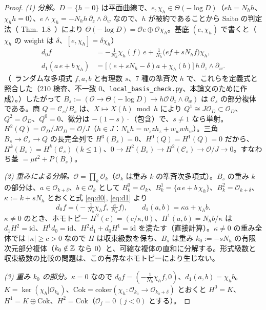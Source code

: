 \begin{proof}
\emph{(1) 分解。}$D=\{h=0\}$ は平面曲線で、$e,\chi_h\in\Theta(-\log D)$（$eh=N_hh$、$\chi_hh=0$）、$e\wedge\chi_h=-N_hh\,\partial_z\wedge\partial_w$ なので、$h$ が被約であることから Saito の判定法（\cite{Saito} Thm.~1.8\tC\ \tQ）により $\Theta(-\log D)=\mathcal Oe\oplus\mathcal O\chi_h$。基底 $(e,\chi_h)$ で書くと（$\chi_h$ の weight は $\delta$、$[e,\chi_h]=\delta\chi_h$）
\begin{align}
d_0f&=-\tfrac1{N_h}\chi_h(f)\,e+\tfrac1{N_h}\bigl(ef+sN_hf\bigr)\chi_h,\label{eq:d0}\\
d_1(a\,e+b\,\chi_h)&=\bigl[(e+sN_h-\delta)a+\chi_h(b)\bigr]\,h\,\partial_z\wedge\partial_w.\label{eq:d1}
\end{align}
（\tV\ ランダムな多項式 $f,a,b$ と有理数 $s$、7 種の準斉次 $h$ で、これらを定義式と照合した（210 検査、不一致 0、\texttt{local\_basis\_check.py}、本論文のために作成）。）したがって $B_s:=(\mathcal O\to\Theta(-\log D)\to h\mathcal O\,\partial_z\wedge\partial_w)$ は $\mathcal C_s$ の部分複体である。商 $Q=\mathcal C_s/B_s$ は、$X\mapsto X(h)\bmod h$ により $Q^1\cong J\mathcal O_D\subset\mathcal O_D$、$Q^2=\mathcal O_D$、$Q^0=0$、微分は $-(1-s)\cdot$（包含）で、$s\ne1$ なら単射。$H^2(Q)=\mathcal O_D/J\mathcal O_D=\mathcal O/J$（$h\in J$：$N_hh=w_zzh_z+w_wwh_w$）。三角 $B_s\to\mathcal C_s\to Q$ の長完全列で $H^3(B_s)=0$、$H^0(Q)=H^1(Q)=0$ だから、$H^k(B_s)=H^k(\mathcal C_s)\ (k\le1)$、$0\to H^2(B_s)\to H^2(\mathcal C_s)\to\mathcal O/J\to0$。すなわち茎 $=\mu t^2+P(B_s)$。

\emph{(2) 重みによる分解。}$\mathcal O=\prod_k\mathcal O_k$（$\mathcal O_k$ は重み $k$ の準斉次多項式）。$B_s$ の重み $k$ の部分は、$a\in\mathcal O_{k+\delta}$、$b\in\mathcal O_k$ として $B^0_k=\mathcal O_k$、$B^1_k=\{a\,e+b\,\chi_h\}$、$B^2_k=\mathcal O_{k+\delta}$、$\kappa:=k+sN_h$ とおくと式 \eqref{eq:d0}, \eqref{eq:d1} より
\[d_0f=\bigl(-\tfrac1{N_h}\chi_hf,\ \tfrac\kappa{N_h}f\bigr),\qquad d_1(a,b)=\kappa a+\chi_hb.\]
$\kappa\ne0$ のとき、ホモトピー $H^2(c)=(c/\kappa,0)$、$H^1(a,b)=N_hb/\kappa$ は $d_1H^2=\mathrm{id}$、$H^1d_0=\mathrm{id}$、$H^2d_1+d_0H^1=\mathrm{id}$ を満たす（直接計算）。$\kappa\ne0$ の重み全体では $|\kappa|\ge c>0$ なので $H$ は収束級数を保ち、$B_s$ は重み $k_0:=-sN_h$ の有限次元部分複体（$k_0\notin\mathbb Z$ なら 0）と、可縮な複体の直和に分解する。形式級数と収束級数の比較の問題は、この有界なホモトピーにより生じない。

\emph{(3) 重み $k_0$ の部分。}$\kappa=0$ なので $d_0f=(-\tfrac1{N_h}\chi_hf,0)$、$d_1(a,b)=\chi_hb$。$K=\ker(\chi_h|\mathcal O_{k_0})$、$\mathrm{Cok}=\mathrm{coker}(\chi_h:\mathcal O_{k_0}\to\mathcal O_{k_0+\delta})$ とおくと $H^0=K$、$H^1=K\oplus\mathrm{Cok}$、$H^2=\mathrm{Cok}$（$\mathcal O_j=0\ (j<0)$ とする）。


\end{proof}
